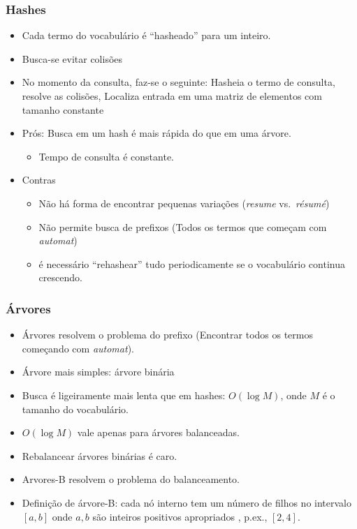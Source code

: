 \documentclass[compress]{beamer}
\begin{document}
\begin{frame}
\frametitle{Hashes}
\begin{itemize}[<+->]
\item Cada termo do vocabulário é ``hasheado'' para um inteiro.
\item Busca-se evitar colisões
\item No momento da consulta, faz-se o seguinte: Hasheia o termo de 
consulta, resolve as colisões, Localiza entrada em uma matriz de 
elementos com tamanho constante
\item Prós: Busca em um hash é mais rápida do que em uma árvore.
\begin{itemize}[<+->]
\item Tempo de consulta é constante.
\end{itemize}
\item Contras
\begin{itemize}[<+->]
\item Não há forma de encontrar pequenas variações (\emph{resume} vs.\
  \emph{r\'{e}sum\'{e}})
\item Não permite busca de prefixos (Todos os termos que começam com
\emph{automat})
\item é necessário ``rehashear'' tudo periodicamente se o vocabulário continua 
crescendo.
\end{itemize}
\end{itemize}
\end{frame}


\begin{frame}
\frametitle{Árvores}
\begin{itemize}[<+->]
\item Árvores resolvem o problema do prefixo (Encontrar todos os termos 
começando com \emph{automat}).
\item Árvore mais simples: árvore binária
\item Busca é ligeiramente mais lenta que em hashes: $O(\log M)$,
  onde $M$ é o tamanho do vocabulário.
\item $O(\log M)$ vale apenas para árvores {\color{blue} balanceadas}.
\item Rebalancear árvores binárias é caro.
\item {\color{blue} Arvores-B} resolvem o problema do balanceamento.
\item Definição de árvore-B: cada nó interno tem um número de filhos no 
intervalo $[a,b]$ onde $a,b$ são inteiros positivos
  apropriados , p.ex., $[2,4]$.
\end{itemize}
\end{frame}
\end{document}
